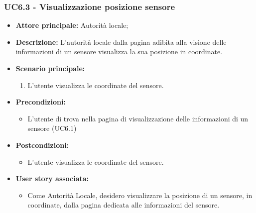 \subsubsection{UC6.3 - Visualizzazione posizione sensore}
\begin{itemize}
    \item \textbf{Attore principale:} Autorità locale;
    \item \textbf{Descrizione:} L’autorità locale dalla pagina adibita alla visione delle informazioni di un sensore visualizza la sua posizione in coordinate.
    \item \textbf{Scenario principale:}
          \begin{enumerate}
              \item L'utente visualizza le coordinate del sensore.
          \end{enumerate}
    \item \textbf{Precondizioni:}
          \begin{itemize}
              \item  L'utente di trova nella pagina di visualizzazione delle informazioni di un sensore (UC6.1)
          \end{itemize}
    \item \textbf{Postcondizioni:}
          \begin{itemize}
              \item  L'utente visualizza le coordinate del sensore.
          \end{itemize}
    \item \textbf{User story associata:}
          \begin{itemize}
              \item Come Autorità Locale, desidero visualizzare la posizione di un sensore, in coordinate, dalla pagina dedicata alle informazioni del sensore.
          \end{itemize}
\end{itemize}
